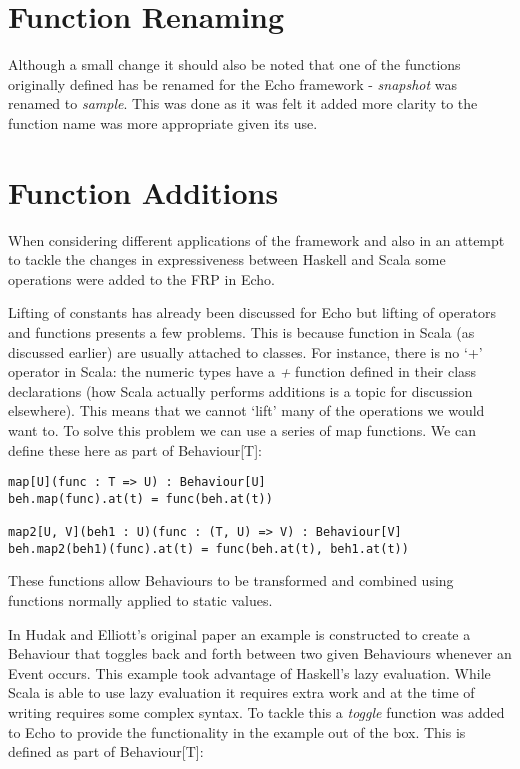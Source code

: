   \section{Function Renaming}
    Although a small change it should also be noted that one of the functions originally defined
    has be renamed for the Echo framework - \emph{snapshot} was renamed to \emph{sample}. This was done as
    it was felt it added more clarity to the function name was more appropriate given its use.
    
  \section{Function Additions}
    When considering different applications of the framework and also in an attempt to
    tackle the changes in expressiveness between Haskell and Scala some operations
    were added to the FRP in Echo.
    
    Lifting of constants has already been discussed for Echo but lifting of operators and
    functions presents a few problems. This is because function in Scala (as discussed earlier)
    are usually attached to classes. For instance, there is no `+' operator in Scala: the numeric
    types have a \emph{+} function defined in their class declarations (how Scala actually performs additions
    is a topic for discussion elsewhere). This means that we cannot `lift' many of the operations we
    would want to. To solve this problem we can use a series of map functions. We can define these
    here as part of Behaviour[T]:

\begin{verbatim}
map[U](func : T => U) : Behaviour[U]
beh.map(func).at(t) = func(beh.at(t))

map2[U, V](beh1 : U)(func : (T, U) => V) : Behaviour[V]
beh.map2(beh1)(func).at(t) = func(beh.at(t), beh1.at(t))
\end{verbatim}        

    These functions allow Behaviours to be transformed and combined using functions
    normally applied to static values.
    
    In Hudak and Elliott's original paper an example is constructed to create a Behaviour
    that toggles back and forth between two given Behaviours whenever an Event occurs. This
    example took advantage of Haskell's lazy evaluation. While Scala is able to use lazy evaluation
    it requires extra work and at the time of writing requires some complex syntax. To tackle this
    a \emph{toggle} function was added to Echo to provide the functionality in the example out of the box.
    This is defined as part of Behaviour[T]:
    
